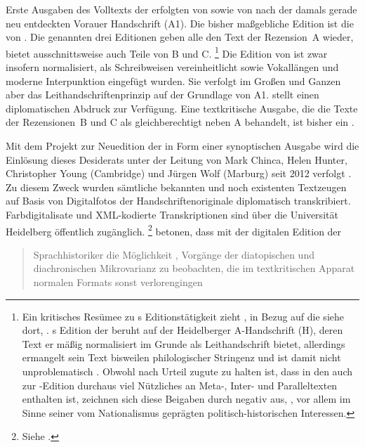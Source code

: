 Erste Ausgaben des Volltexts der \KC{} erfolgten von \citet{massmann:kukb}
sowie von \citet{diemer1849} nach der damals gerade neu entdeckten Vorauer
Handschrift (A1). Die bisher maßgebliche Edition ist die von
\citet{schroeder1895}. Die genannten drei Editionen geben alle den Text
der Rezension~A wieder, \citeauthor{massmann:kukb} bietet ausschnittsweise auch
Teile von B und C.%
%
	\footnote{Ein kritisches Resümee zu \citeauthor{massmann:kukb}s
		Editionstätigkeit zieht \citet{wolf2023}, in Bezug auf die
		\KC{} siehe dort, .
		\citeauthor{massmann:kukb}s Edition der \KC{} beruht auf der
		Heidelberger A-Handschrift (H), deren Text er mäßig normalisiert im
		Grunde als Leithandschrift bietet, allerdings ermangelt sein Text
		bisweilen philologischer Stringenz und ist damit nicht unproblematisch
		\autocite[125--126]{wolf2023}. Obwohl \citeauthor{massmann:kukb} nach
		 Urteil zugute zu halten ist, dass in den
		 auch zur \KC{}-Edition durchaus
		viel Nützliches an Meta-, Inter- und Paralleltexten enthalten ist,
		zeichnen sich diese Beigaben durch  negativ aus,
		, vor allem im
		Sinne seiner vom Nationalismus geprägten politisch-historischen
		Interessen.%
	}
%
Die Edition von \citeauthor{schroeder1895} ist zwar insofern normalisiert, als
Schreibweisen vereinheitlicht sowie Vokal\-längen und moderne Interpunktion
eingefügt wurden. Sie verfolgt im Großen und Ganzen aber das
Leit\-handschriften\-prinzip auf der Grundlage von A1. \citeauthor{diemer1849}
stellt einen diplomatischen Abdruck zur Verfügung. Eine textkritische Ausgabe,
die die Texte der Rezensionen~B und C als gleichberechtigt neben A behandelt,
ist bisher ein .

Mit dem Projekt zur Neuedition der \KC{} in Form einer synoptischen Ausgabe
wird die Einlösung dieses Desiderats unter der Leitung von Mark
Chinca, Helen Hunter, Christopher Young (Cambridge) und Jürgen Wolf (Marburg)
seit 2012 verfolgt \autocite{chincaetal2019b}. Zu diesem Zweck wurden sämtliche
bekannten und noch existenten Textzeugen auf Basis von Digitalfotos der
Handschriften\-originale diplomatisch transkribiert. Farb\-digitalisate und
XML-ko\-dier\-te Transkriptionen sind über die Universität Heidelberg
öffentlich zugänglich.%
%
	\footnote{Siehe \nocite{kcdigital}.}
%
\citet[287]{chincaetal2019b} betonen, dass mit der digitalen Edition der
\KC{} \blockquote{Sprachhistoriker \textelp{} die Möglichkeit ,
Vorgänge der dia\-topischen und dia\-chronischen Mikrovarianz zu beobachten,
die im textkritischen Apparat normalen Formats sonst verlorengingen}.


